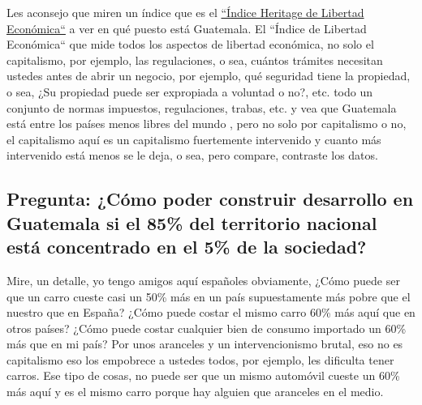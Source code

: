 Les aconsejo que miren un índice que es el \href{https://en.wikipedia.org/wiki/Index_of_Economic_Freedom}{``Índice Heritage de Libertad Económica``} a ver en qué puesto está Guatemala. El ``Índice de Libertad Económica`` que mide todos los aspectos de libertad económica, no solo el capitalismo, por ejemplo, las regulaciones, o sea, cuántos trámites necesitan ustedes antes de abrir un negocio, por ejemplo, qué seguridad tiene la propiedad, o sea, ¿Su propiedad puede ser expropiada a voluntad o no?, etc. todo un conjunto de normas impuestos, regulaciones, trabas, etc. y vea que Guatemala está entre los países menos libres del mundo , pero no solo por capitalismo o no, el capitalismo aquí es un capitalismo fuertemente intervenido y cuanto más intervenido está menos se le deja, o sea, pero compare, contraste los datos.

\subsection{Pregunta: ¿Cómo poder construir desarrollo en Guatemala si el 85\% del territorio nacional está concentrado en el 5\% de la sociedad?}

Mire, un detalle, yo tengo amigos aquí españoles obviamente, ¿Cómo puede ser que un carro cueste casi un 50\% más en un país supuestamente más pobre
que el nuestro que en España? ¿Cómo puede costar el mismo carro 60\% más aquí que en otros países? ¿Cómo puede costar cualquier bien de consumo importado un 60\% más que en mi país? Por unos aranceles y un intervencionismo brutal, eso no es capitalismo eso los empobrece a ustedes todos, por ejemplo, les dificulta tener carros. Ese tipo de cosas, no puede ser que un mismo automóvil cueste un 60\% más aquí y es el mismo carro porque hay alguien que aranceles en el medio.
